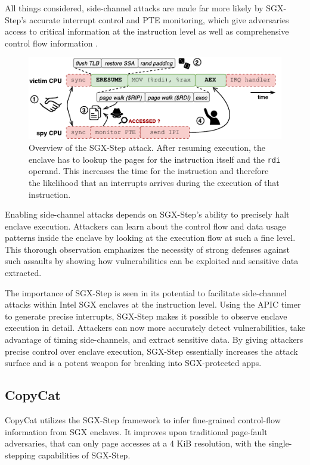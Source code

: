\documentclass{llncs}
\begin{document}
All things considered, side-channel attacks are made far more likely by SGX-Step's accurate interrupt control and PTE monitoring, which give adversaries access to critical information at the instruction level as well as comprehensive control flow information \cite{BulckPS17}.

\begin{figure}[t]
  \centering
  \includegraphics{images/sgx-step-pte.pdf}
  \caption{Overview of the SGX-Step attack.
    After resuming execution, the enclave has to lookup the pages for
    the instruction itself and the \texttt{rdi} operand. This increases the time
    for the instruction and therefore the likelihood that an interrupts arrives
    during the execution of that instruction.}
  \label{fig:sgx-step-pte}
\end{figure}

Enabling side-channel attacks depends on SGX-Step's ability to precisely halt enclave execution. Attackers can learn about the control flow and data usage patterns inside the enclave by looking at the execution flow at such a fine level. This thorough observation emphasizes the necessity of strong defenses against such assaults by showing how vulnerabilities can be exploited and sensitive data extracted.

The importance of SGX-Step is seen in its potential to facilitate side-channel attacks within Intel SGX enclaves at the instruction level. Using the APIC timer to generate precise interrupts, SGX-Step makes it possible to observe enclave execution in detail. Attackers can now more accurately detect vulnerabilities, take advantage of timing side-channels, and extract sensitive data. By giving attackers precise control over enclave execution, SGX-Step essentially increases the attack surface and is a potent weapon for breaking into SGX-protected apps.
\subsection{CopyCat}

CopyCat \cite{MoghimiBHPS20} utilizes the SGX-Step framework
to infer fine-grained control-flow information from SGX enclaves.
It improves upon traditional page-fault adversaries,
that can only page accesses at a 4 KiB resolution,
with the single-stepping capabilities of SGX-Step.
\end{document}
